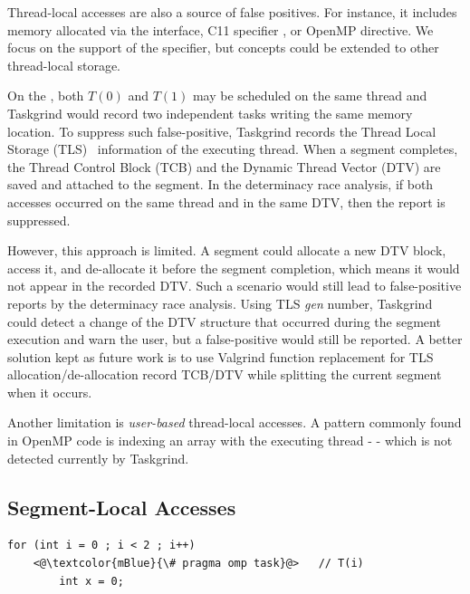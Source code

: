 Thread-local accesses are also a source of false positives.
For instance, it includes memory allocated via the  interface, C11 specifier , or OpenMP  directive.
We focus on the support of the  specifier, but concepts could be extended to other thread-local storage.

On the , both $T(0)$ and $T(1)$ may be scheduled on the same thread and Taskgrind would record two independent tasks writing the same memory location.
To suppress such false-positive, Taskgrind records the Thread Local Storage (TLS)~\cite{elf-tls} information of the executing thread.
When a segment completes, the Thread Control Block (TCB) and the Dynamic Thread Vector (DTV) are saved and attached to the segment.
In the determinacy race analysis, if both accesses occurred on the same thread and in the same DTV, then the report is suppressed.

However, this approach is limited.
A segment could allocate a new DTV block, access it, and de-allocate it before the segment completion, which means it would not appear in the recorded DTV.
Such a scenario would still lead to false-positive reports by the determinacy race analysis.
Using TLS \emph{gen} number, Taskgrind could detect a change of the DTV structure that occurred during the segment execution and warn the user, but a false-positive would still be reported.
A better solution kept as future work is to use Valgrind function replacement for TLS allocation/de-allocation record TCB/DTV while splitting the current segment when it occurs.

Another limitation is \emph{user-based} thread-local accesses.
A pattern commonly found in OpenMP code is indexing an array with the executing thread -  - which is not detected currently by Taskgrind.


\subsection{Segment-Local Accesses}

\begin{minipage}{\linewidth}
\begin{lstlisting}[style=CStyle, captionpos=b, caption={Memory Recycling false-positives}, label={lst:task-local-false-positive}]
for (int i = 0 ; i < 2 ; i++)
	<@\textcolor{mBlue}{\# pragma omp task}@>	// T(i)
		int x = 0;
\end{lstlisting}
\end{minipage}

